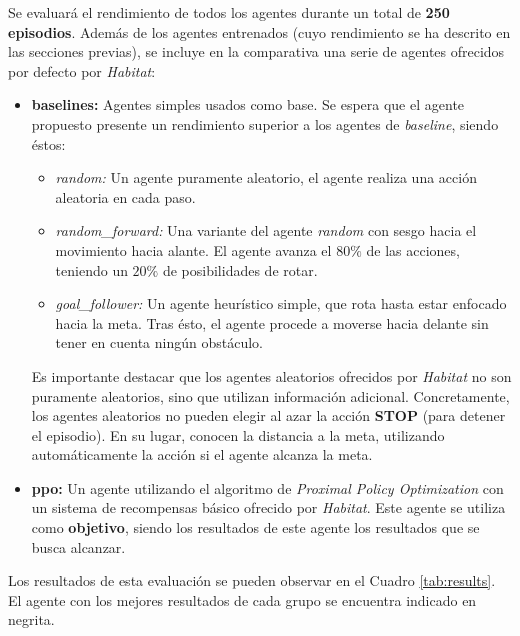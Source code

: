 Se evaluará el rendimiento de todos los agentes durante un total de \textbf{250 episodios}. Además de los agentes entrenados (cuyo rendimiento se ha descrito en las secciones previas), se incluye en la comparativa una serie de agentes ofrecidos por defecto por \textit{Habitat}:

\begin{itemize}
	\item \textbf{baselines:} Agentes simples usados como base. Se espera que el agente propuesto presente un rendimiento superior a los agentes de \textit{baseline}, siendo éstos:
	\begin{itemize}
	\item \textit{random:} Un agente puramente aleatorio, el agente realiza una acción aleatoria en cada paso.
	\item \textit{random{\_}forward:} Una variante del agente \textit{random} con sesgo hacia el movimiento hacia alante. El agente avanza el $80\%$ de las acciones, teniendo un $20\%$ de posibilidades de rotar.
	\item \textit{goal{\_}follower:} Un agente heurístico simple, que rota hasta estar enfocado hacia la meta. Tras ésto, el agente procede a moverse hacia delante sin tener en cuenta ningún obstáculo.
	\end{itemize}
	
	Es importante destacar que los agentes aleatorios ofrecidos por \textit{Habitat} no son puramente aleatorios, sino que utilizan información adicional. Concretamente, los agentes aleatorios no pueden elegir al azar la acción \textbf{STOP} (para detener el episodio). En su lugar, conocen la distancia a la meta, utilizando automáticamente la acción si el agente alcanza la meta.
	
	\item \textbf{ppo:} Un agente utilizando el algoritmo de \textit{Proximal Policy Optimization} con un sistema de recompensas básico ofrecido por \textit{Habitat}. Este agente se utiliza como \textbf{objetivo}, siendo los resultados de este agente los resultados que se busca alcanzar.
	
\end{itemize}

Los resultados de esta evaluación se pueden observar en el Cuadro \ref{tab:results}. El agente con los mejores resultados de cada grupo se encuentra indicado en negrita.

